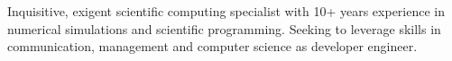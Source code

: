 \documentclass[10pt,a4paper,ragged2e,academicons]{../altacv}
\begin{document}

\begin{fullwidth}
\makecvheader

\vspace{-5mm}
\parbox{.7\paperwidth}{%
Inquisitive, exigent scientific computing specialist with 10+ years experience in numerical simulations and scientific programming. Seeking to leverage skills in communication, management and computer science as 
developer engineer.
}

\end{fullwidth}


\end{document}
